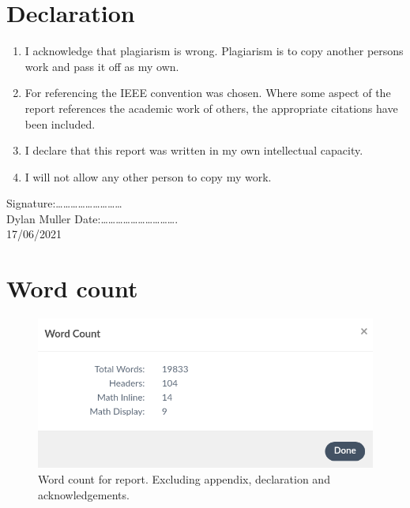 \section{Declaration}

\begin{enumerate}
\item I acknowledge that plagiarism is wrong. Plagiarism is to copy another persons work and pass it off as my own.
\item For referencing the IEEE convention was chosen. Where some aspect of the report references the academic work of others, the appropriate citations have been included.
\item I declare that this report was written in my own intellectual capacity.
\item I will not allow any other person to copy my work.
\end{enumerate}
\vskip 10mm
Signature:\ldots\ldots\ldots\ldots\ldots\ldots\ldots\ldots\ldots 
\\Dylan Muller
\vskip10mm
Date:\ldots\ldots\ldots\ldots\ldots\ldots\ldots\ldots\ldots\ldots .
\\17/06/2021

\section{Word count}
\begin{figure}[H]
\centering
\includegraphics[width=0.8\columnwidth]{Figures/Fig_86.png}
\caption{Word count for report. Excluding appendix, declaration and acknowledgements.}
\label{fig:gantt}
\end{figure}